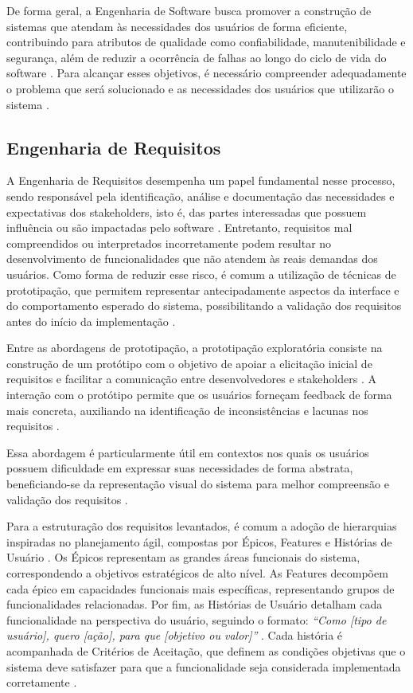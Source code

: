 De forma geral, a Engenharia de Software busca promover a construção de sistemas que atendam às necessidades dos usuários de forma eficiente, contribuindo para atributos de qualidade como confiabilidade, manutenibilidade e segurança, além de reduzir a ocorrência de falhas ao longo do ciclo de vida do software \cite{sommerville2019}. Para alcançar esses objetivos, é necessário compreender adequadamente o problema que será solucionado e as necessidades dos usuários que utilizarão o sistema \cite{netto2025}.
 
\subsection{Engenharia de Requisitos}
 
A Engenharia de Requisitos desempenha um papel fundamental nesse processo, sendo responsável pela identificação, análise e documentação das necessidades e expectativas dos stakeholders, isto é, das partes interessadas que possuem influência ou são impactadas pelo software \cite{sommerville1997}. Entretanto, requisitos mal compreendidos ou interpretados incorretamente podem resultar no desenvolvimento de funcionalidades que não atendem às reais demandas dos usuários. Como forma de reduzir esse risco, é comum a utilização de técnicas de prototipação, que permitem representar antecipadamente aspectos da interface e do comportamento esperado do sistema, possibilitando a validação dos requisitos antes do início da implementação \cite{netto2025}.
 
Entre as abordagens de prototipação, a prototipação exploratória consiste na construção de um protótipo com o objetivo de apoiar a elicitação inicial de requisitos e facilitar a comunicação entre desenvolvedores e stakeholders \cite{carrizo2018}. A interação com o protótipo permite que os usuários forneçam feedback de forma mais concreta, auxiliando na identificação de inconsistências e lacunas nos requisitos \cite{preece2015interaction, carrizo2018}.

Essa abordagem é particularmente útil em contextos nos quais os usuários possuem dificuldade em expressar suas necessidades de forma abstrata, beneficiando-se da representação visual do sistema para melhor compreensão e validação dos requisitos \cite{preece2015interaction}.
 
Para a estruturação dos requisitos levantados, é comum a adoção de hierarquias inspiradas no planejamento ágil, compostas por Épicos, Features e Histórias de Usuário \cite{cohn2004, lucassen2015forging}. Os Épicos representam as grandes áreas funcionais do sistema, correspondendo a objetivos estratégicos de alto nível. As Features decompõem cada épico em capacidades funcionais mais específicas, representando grupos de funcionalidades relacionadas. Por fim, as Histórias de Usuário detalham cada funcionalidade na perspectiva do usuário, seguindo o formato: \textit{``Como [tipo de usuário], quero [ação], para que [objetivo ou valor]''} \cite{cohn2004}. Cada história é acompanhada de Critérios de Aceitação, que definem as condições objetivas que o sistema deve satisfazer para que a funcionalidade seja considerada implementada corretamente \cite{cohn2004, dalpiaz2018agile}.
 
